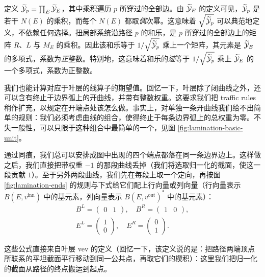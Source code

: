 
定义 $\widetilde{\cal Y}_p = \prod_E \widetilde{\cal Y}_E$，其中乘积遍历 $p$ 所穿过的全部边。由 $\widetilde{\cal Y}_E$ 的定义可见，$\widetilde{\cal Y}_p$ 是若干 $N(E)$ 的乘积，而每个 $N(E)$ 都取\emph{偶}次幂。这意味着 $\sqrt{\widetilde{\cal Y}_p}$ 可以典范地定义，不依赖任何选择。扭局部系统沿路径 $p$ 的和乐，是 $p$ 所穿过的全部边上的矩阵 $R$、$L$ 与 $M_E$ 的乘积。因此该和乐等于 $1/\sqrt{\widetilde{\cal Y}_p}$ 乘上一个矩阵，其元素是 $\widetilde{\cal Y}_E$ 的多项式，系数为\emph{正}整数。特别地，这意味着和乐的\emph{迹}等于 $1/\sqrt{\widetilde{\cal Y}_p}$ 乘上 $\widetilde{\cal Y}_E$ 的一个多项式，系数为正整数。

我们也能计算对应于叶层的线算子的期望值。回忆一下，叶层除了闭曲线之外，还可以含有终止于边界弧上的开曲线，并带有整数权重。这要求我们把 traffic rules 稍作扩充，以规定在开端点处该怎么做。事实上，对单独一条开曲线我们给不出简单的规则：我们必须考虑曲线的组合，使得终止于每条边界弧上的总权重为零。不失一般性，可以只限于这种组合中最简单的一个，见图 \ref{fig:lamination-basic-unit}。


通过同痕，我们总可以安排成图中出现的四个端点都落在同一条边界边上。这样做之后，我们直接把带权重 $-1$ 的那段曲线丢掉（我们将选取归一化的截面，使这一段贡献 $1$）。至于另外两段曲线，我们先在每段上取一个定向，再按图 \ref{fig:lamination-ends} 的规则与下式给它们配上行向量或列向量（行向量表示 $B(E, v^{\mathrm{inn}})$ 中的基元素，列向量表示 $B(E, v^{\mathrm{out}})^*$ 中的基元素）：
\begin{gather}
 B^L = \begin{pmatrix} 0 & 1 \end{pmatrix}, \quad B^R = \begin{pmatrix} 1 & 0 \end{pmatrix}, \\
 E^L = \begin{pmatrix} 1 \\ 0 \end{pmatrix}, \quad E^R = \begin{pmatrix} 0 \\ 1 \end{pmatrix}.
\end{gather}


这些公式直接来自叶层 vev 的定义（回忆一下，该定义说的是：把路径两端顶点所联系的平坦截面平行移动到同一公共点，再取它们的楔积）：这里我们把归一化的截面从路径的终点搬运到起点。


